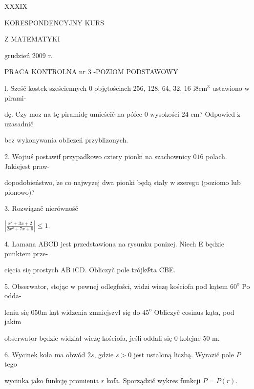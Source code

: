 \documentclass[a4paper,12pt]{article}
\begin{document}
XXXIX

KORESPONDENCYJNY KURS

Z MATEMATYKI

grudzień 2009 r.

PRACA KONTROLNA nr 3 -POZIOM PODSTAWOWY

l. Sześč kostek sześciennych $0$ objętościach 256, 128, 64, 32, 16 $\mathrm{i}8\mathrm{c}\mathrm{m}^{3}$ ustawiono $\mathrm{w}$ pirami-

dę. Czy $\mathrm{m}\mathrm{o}\dot{\mathrm{z}}$ na tę piramidę umieścič na pófce $0$ wysokości 24 cm? Odpowied $\acute{\mathrm{z}}$ uzasadnič

bez wykonywania obliczeń przyblizonych.

2. Wojtuś postawif przypadkowo cztery pionki na szachownicy $016$ polach. Jakiejest praw-

dopodobieństwo, $\dot{\mathrm{z}}\mathrm{e}$ co najwyzej dwa pionki będą staly $\mathrm{w}$ szeregu (poziomo lub pionowo)?

3. Rozwiązač nierównośč

$|\displaystyle \frac{x^{2}+3x+2}{2x^{2}+7x+6}|\leq 1.$

4. Lamana ABCD jest przedstawiona na rysunku ponizej. Niech E będzie punktem prze-

cięcia się prostych AB iCD. Obliczyč pole trójk$\Phi$ta CBE.

5. Obserwator, stojąc $\mathrm{w}$ pewnej odlegfości, widzi wiezę kościofa pod kątem $60^{\mathrm{o}}$ Po odda-

leniu się $050\mathrm{m}$ kąt widzenia zmniejszył się do $45^{\mathrm{o}}$ Obliczyč cosinus kąta, pod jakim

obserwator będzie widział wiezę kościofa, jeśli oddali się $0$ kolejne 50 $\mathrm{m}.$

6. Wycinek koła ma obwód $2s$, gdzie $s > 0$ jest ustaloną liczbą. Wyrazič pole $P$ tego

wycinka jako funkcję promienia $r$ kofa. Sporządzič wykres funkcji $P=P(r).$
\end{document}
